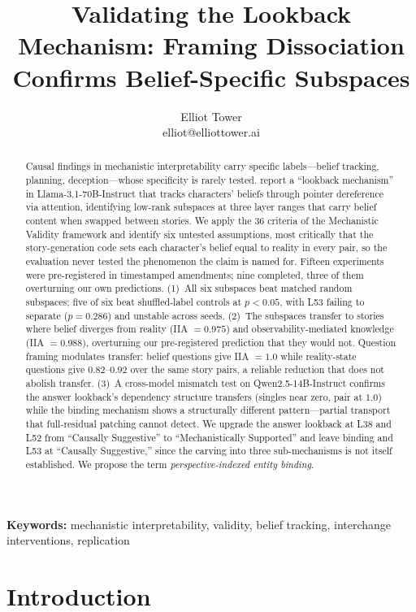 \documentclass{article}
\title{Validating the Lookback Mechanism: Framing Dissociation Confirms Belief-Specific Subspaces}
\author{\name Elliot Tower \\
      \email elliot@elliottower.ai}
\begin{document}
\maketitle

\begin{abstract}
Causal findings in mechanistic interpretability carry specific labels---belief tracking, planning, deception---whose specificity is rarely tested. \citet{prakash2025lookback} report a ``lookback mechanism'' in Llama-3.1-70B-Instruct that tracks characters' beliefs through pointer dereference via attention, identifying low-rank subspaces at three layer ranges that carry belief content when swapped between stories. We apply the 36 criteria of the Mechanistic Validity framework and identify six untested assumptions, most critically that the story-generation code sets each character's belief equal to reality in every pair, so the evaluation never tested the phenomenon the claim is named for. Fifteen experiments were pre-registered in timestamped amendments; nine completed, three of them overturning our own predictions. (1)~All six subspaces beat matched random subspaces; five of six beat shuffled-label controls at $p < 0.05$, with L53 failing to separate ($p = 0.286$) and unstable across seeds. (2)~The subspaces transfer to stories where belief diverges from reality (IIA $= 0.975$) and observability-mediated knowledge (IIA $= 0.988$), overturning our pre-registered prediction that they would not. Question framing modulates transfer: belief questions give IIA $= 1.0$ while reality-state questions give $0.82$--$0.92$ over the same story pairs, a reliable reduction that does not abolish transfer. (3)~A cross-model mismatch test on Qwen2.5-14B-Instruct confirms the answer lookback's dependency structure transfers (singles near zero, pair at $1.0$) while the binding mechanism shows a structurally different pattern---partial transport that full-residual patching cannot detect. We upgrade the answer lookback at L38 and L52 from ``Causally Suggestive'' to ``Mechanistically Supported'' and leave binding and L53 at ``Causally Suggestive,'' since the carving into three sub-mechanisms is not itself established. We propose the term \emph{perspective-indexed entity binding}.
\end{abstract}

\noindent\textbf{Keywords:} mechanistic interpretability, validity, belief tracking, interchange interventions, replication


\section{Introduction}
\label{sec:intro}
\end{document}
